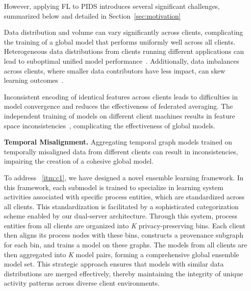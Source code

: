 However, applying FL to PIDS introduces several significant challenges, summarized below and detailed in Section~\ref{sec:motivation}

\begin{enumerate}[itemsep=0.1em, parsep=0em, topsep=0em]
   Data distribution and volume can vary significantly across clients, complicating the training of a global model that performs uniformly well across all clients. Heterogeneous data distributions from clients running different applications can lead to suboptimal unified model performance~\cite{qu2022rethinking}. Additionally, data imbalances across clients, where smaller data contributors have less impact, can skew learning outcomes~\cite{duan2020self}.

   Inconsistent encoding of identical features across clients leads to difficulties in model convergence and reduces the effectiveness of federated averaging. The independent training of \wordvec models on different client machines results in feature space inconsistencies~\cite{zhou2023fedfa}, complicating the effectiveness of global \gnnshort models.

   {\bf Temporal Misalignment.} Aggregating temporal graph models trained on temporally misaligned data from different clients can result in inconsistencies, impairing the creation of a cohesive global model.
  
\end{enumerate}



To address ~\ref{itm:c1}, we have designed a novel ensemble learning framework. In this framework, each submodel is trained to specialize in learning system activities associated with specific process entities, which are standardized across all clients. This standardization is facilitated by a sophisticated categorization scheme enabled by our dual-server architecture. Through this system, process entities from all clients are organized into \textit{K} privacy-preserving bins. Each client then aligns its process nodes with these bins, constructs a provenance subgraph for each bin, and trains a \gnnshort model on these graphs. The models from all clients are then aggregated into \textit{K} model pairs, forming a comprehensive global ensemble model set. This strategic approach ensures that models with similar data distributions are merged effectively, thereby maintaining the integrity of unique activity patterns across diverse client environments.

